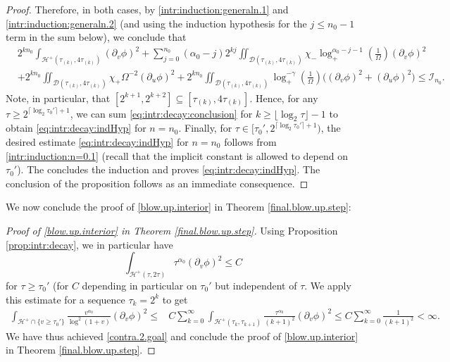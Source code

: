 \documentclass[10pt, reqno]{amsart}
\theoremstyle{definition}
\theoremstyle{remark}
\numberwithin{equation}{section}
\newcommand{\rd}{\partial}
\newcommand{\bb}{\Big}
\newcommand{\0}{\emptyset}
\newcommand{\alp}{\alpha}
\newcommand{\Omg}{\Omega}
\newcommand{\calD}{\mathcal D}
\newcommand{\calH}{\mathcal H}
\newcommand{\calI}{\mathcal I}
\newcommand{\f}{\frac}
\newcommand{\EH}{\calH^{+}}
\begin{document}
\begin{proof}
Therefore, in both cases, by \eqref{intr:induction:generaln.1} and \eqref{intr:induction:generaln.2} (and using the induction hypothesis for the $j\leq n_0-1$ term in the sum below), we conclude that 
\begin{equation} \label{eq:intr:decay:conclusion}
\begin{aligned}
&
	2^{kn_0} \int_{\EH(\tau_{(k)}, 4\tau_{(k)})} (\rd_{v} \phi)^{2} 
	+ \sum_{j=0}^{n_0} (\alp_{0} - j) 2^{kj} \iint_{\calD(\tau_{(k)}, 4\tau_{(k)})} \chi_{-} \log_+^{\alp_{0}-j-1} (\frac{1}{\Omg}) (\rd_{v} \phi)^{2} \\
	& + 2^{kn_0} \iint_{\calD(\tau_{(k)}, 4\tau_{(k)})} \chi_{+} \Omg^{-2} (\rd_{u} \phi)^{2} 
	+ 2^{kn_0} \iint_{\calD(\tau_{(k)}, 4\tau_{(k)})} \log_+^{-\gamma}(\f{1}{\Omg}) \bb( (\rd_{v} \phi)^{2} + (\rd_{u} \phi)^{2} \bb)
	\leq \calI_{n_0}.
\end{aligned}
\end{equation}
Note, in particular, that $[2^{k+1}, 2^{k+2}] \subseteq [\tau_{(k)}, 4 \tau_{(k)}]$. Hence, for any $\tau \geq 2^{\lceil \log_2\tau_0' \rceil+1}$, we can sum \eqref{eq:intr:decay:conclusion} for $k\geq \lfloor \log_2\tau\rfloor -1$ to obtain \eqref{eq:intr:decay:indHyp} for $n = n_{0}$. Finally, for $\tau\in [\tau_0', 2^{\lceil \log_2\tau_0' \rceil+1})$, the desired estimate \eqref{eq:intr:decay:indHyp} for $n=n_0$ follows from \eqref{intr:induction:n=0.1} (recall that the implicit constant is allowed to depend on $\tau_0'$). The concludes the induction and proves \eqref{eq:intr:decay:indHyp}. The conclusion of the proposition follows as an immediate consequence.
\qedhere
\end{proof}

We now conclude the proof of \eqref{blow.up.interior} in  Theorem \ref{final.blow.up.step}:
\begin{proof}[Proof of \eqref{blow.up.interior} in Theorem \ref{final.blow.up.step}]
Using Proposition \ref{prop:intr:decay}, we in particular have 
$$\int_{\mathcal H^+(\tau,2\tau)} \tau^{\alp_0} (\rd_v\phi)^2 \leq C$$
for $\tau\geq \tau_0'$ (for $C$ depending in particular on $\tau_0'$ but independent of $\tau$.
We apply this estimate for a sequence $\tau_k=2^k$ to get
\begin{equation*}
\begin{split}
\int_{\EH\cap\{v\geq \tau_0'\}} \f{v^{\alp_0}}{\log^2(1+v)}(\rd_v\phi)^2\leq &C\sum_{k=0}^\infty \int_{\mathcal H^+(\tau_k,\tau_{k+1})} \f{\tau^{\alp_0}}{(k+1)^2}(\rd_v\phi)^2\leq C\sum_{k=0}^{\infty}\f{1}{(k+1)^2}<\infty.
\end{split}
\end{equation*}
We have thus achieved \eqref{contra.2.goal} and conclude the proof of \eqref{blow.up.interior} in Theorem \ref{final.blow.up.step}.
\qedhere
\end{proof}
\end{document}
